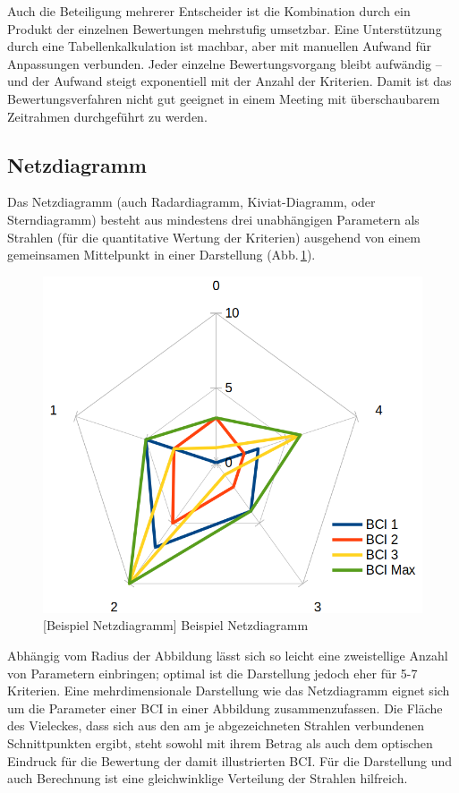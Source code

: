 Auch die Beteiligung mehrerer Entscheider ist die Kombination durch ein Produkt der einzelnen Bewertungen mehrstufig umsetzbar.
Eine Unterstützung durch \zB{} eine Tabellenkalkulation ist machbar, aber mit manuellen Aufwand für Anpassungen verbunden.
Jeder einzelne Bewertungsvorgang bleibt aufwändig -- und der Aufwand steigt exponentiell mit der Anzahl der Kriterien.
Damit ist das Bewertungsverfahren nicht gut geeignet in einem Meeting mit überschaubarem Zeitrahmen durchgeführt zu werden.

\subsection{Netzdiagramm}\label{dep:web}

Das Netzdiagramm (auch Radardiagramm, Kiviat-Diagramm, oder Sterndiagramm) besteht aus mindestens drei unabhängigen Parametern als Strahlen (für die quantitative Wertung der Kriterien) ausgehend von einem gemeinsamen Mittelpunkt in einer Darstellung (Abb.\,\ref{disp:web:pic}).

\begin{figure}[!htp]
\centering
\includegraphics[width=.6\textwidth]{img/disp-web}
[Beispiel Netzdiagramm]{\label{disp:web:pic} Beispiel Netzdiagramm}
\end{figure}

Abhängig vom Radius der Abbildung lässt sich so leicht eine zweistellige Anzahl von Parametern einbringen;
optimal ist die Darstellung jedoch eher für 5-7 Kriterien.
Eine mehrdimensionale Darstellung wie das Netzdiagramm eignet sich um die Parameter einer \gls{BCI} in einer Abbildung zusammenzufassen.
Die Fläche des Vieleckes, dass sich aus den am je abgezeichneten Strahlen verbundenen Schnittpunkten ergibt, steht sowohl mit ihrem Betrag als auch dem optischen Eindruck für die Bewertung der damit illustrierten \gls{BCI}.
Für die Darstellung und auch Berechnung ist eine gleichwinklige Verteilung der Strahlen hilfreich.

